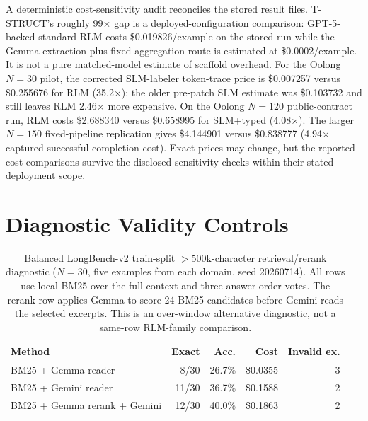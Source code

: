 A deterministic cost-sensitivity audit reconciles the stored result files. T-STRUCT's roughly 99$\times$ gap is a deployed-configuration comparison: GPT-5-backed standard RLM costs \$0.019826/example on the stored run while the Gemma extraction plus fixed aggregation route is estimated at \$0.0002/example. It is not a pure matched-model estimate of scaffold overhead. For the Oolong $N=30$ pilot, the corrected SLM-labeler token-trace price is \$0.007257 versus \$0.255676 for RLM (35.2$\times$); the older pre-patch SLM estimate was \$0.103732 and still leaves RLM 2.46$\times$ more expensive. On the Oolong $N=120$ public-contract run, RLM costs \$2.688340 versus \$0.658995 for SLM+typed (4.08$\times$). The larger $N=150$ fixed-pipeline replication gives \$4.144901 versus \$0.838777 (4.94$\times$ captured successful-completion cost). Exact prices may change, but the reported cost comparisons survive the disclosed sensitivity checks within their stated deployment scope.

\FloatBarrier
\section{Diagnostic Validity Controls}
\label{app:diagnostics}

\begin{table}[!t]
\centering
\small
\setlength{\tabcolsep}{4pt}
\begin{tabular}{@{}p{6.0cm}rrrr@{}}
\toprule
\textbf{Method} & \textbf{Exact} & \textbf{Acc.} & \textbf{Cost} & \textbf{Invalid ex.} \\
\midrule
BM25 + Gemma reader & 8/30 & 26.7\% & \$0.0355 & 3 \\
BM25 + Gemini reader & 11/30 & 36.7\% & \$0.1588 & 2 \\
BM25 + Gemma rerank + Gemini & 12/30 & 40.0\% & \$0.1863 & 2 \\
\bottomrule
\end{tabular}
\caption{Balanced LongBench-v2 train-split $>$500k-character retrieval/rerank diagnostic ($N=30$, five examples from each domain, seed 20260714). All rows use local BM25 over the full context and three answer-order votes. The rerank row applies Gemma to score 24 BM25 candidates before Gemini reads the selected excerpts. This is an over-window alternative diagnostic, not a same-row RLM-family comparison.}
\label{tab:supp-lb2-over500k-rerank}
\end{table}

